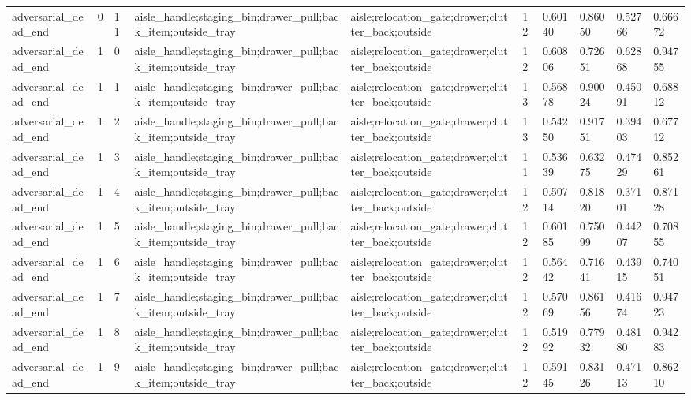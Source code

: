 \documentclass{article}
\begin{document}
\begin{table}[tbp]
{\begin{tabular}{llllllllll}
adversarial\_dead\_end & 0 & 11 & aisle\_handle;staging\_bin;drawer\_pull;back\_item;outside\_tray & aisle;relocation\_gate;drawer;clutter\_back;outside & 12 & 0.60140 & 0.86050 & 0.52766 & 0.66672 \\
adversarial\_dead\_end & 1 & 0 & aisle\_handle;staging\_bin;drawer\_pull;back\_item;outside\_tray & aisle;relocation\_gate;drawer;clutter\_back;outside & 12 & 0.60806 & 0.72651 & 0.62868 & 0.94755 \\
adversarial\_dead\_end & 1 & 1 & aisle\_handle;staging\_bin;drawer\_pull;back\_item;outside\_tray & aisle;relocation\_gate;drawer;clutter\_back;outside & 13 & 0.56878 & 0.90024 & 0.45091 & 0.68812 \\
adversarial\_dead\_end & 1 & 2 & aisle\_handle;staging\_bin;drawer\_pull;back\_item;outside\_tray & aisle;relocation\_gate;drawer;clutter\_back;outside & 13 & 0.54250 & 0.91751 & 0.39403 & 0.67712 \\
adversarial\_dead\_end & 1 & 3 & aisle\_handle;staging\_bin;drawer\_pull;back\_item;outside\_tray & aisle;relocation\_gate;drawer;clutter\_back;outside & 11 & 0.53639 & 0.63275 & 0.47429 & 0.85261 \\
adversarial\_dead\_end & 1 & 4 & aisle\_handle;staging\_bin;drawer\_pull;back\_item;outside\_tray & aisle;relocation\_gate;drawer;clutter\_back;outside & 12 & 0.50714 & 0.81820 & 0.37101 & 0.87128 \\
adversarial\_dead\_end & 1 & 5 & aisle\_handle;staging\_bin;drawer\_pull;back\_item;outside\_tray & aisle;relocation\_gate;drawer;clutter\_back;outside & 12 & 0.60185 & 0.75099 & 0.44207 & 0.70855 \\
adversarial\_dead\_end & 1 & 6 & aisle\_handle;staging\_bin;drawer\_pull;back\_item;outside\_tray & aisle;relocation\_gate;drawer;clutter\_back;outside & 12 & 0.56442 & 0.71641 & 0.43915 & 0.74051 \\
adversarial\_dead\_end & 1 & 7 & aisle\_handle;staging\_bin;drawer\_pull;back\_item;outside\_tray & aisle;relocation\_gate;drawer;clutter\_back;outside & 12 & 0.57069 & 0.86156 & 0.41674 & 0.94723 \\
adversarial\_dead\_end & 1 & 8 & aisle\_handle;staging\_bin;drawer\_pull;back\_item;outside\_tray & aisle;relocation\_gate;drawer;clutter\_back;outside & 12 & 0.51992 & 0.77932 & 0.48180 & 0.94283 \\
adversarial\_dead\_end & 1 & 9 & aisle\_handle;staging\_bin;drawer\_pull;back\_item;outside\_tray & aisle;relocation\_gate;drawer;clutter\_back;outside & 12 & 0.59145 & 0.83126 & 0.47113 & 0.86210 \\

\end{tabular}}
\end{table}
\end{document}
